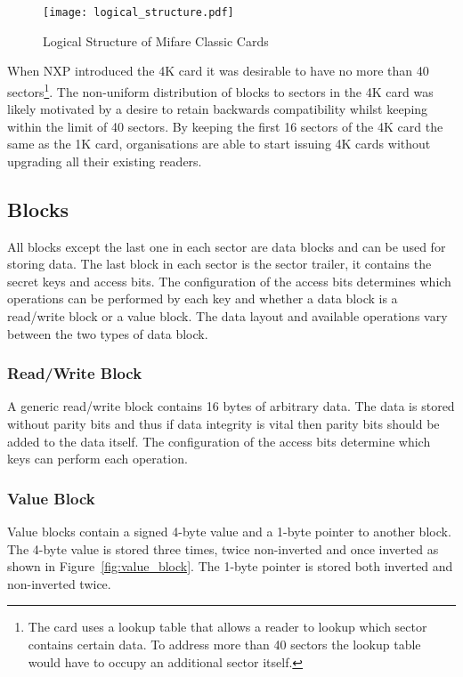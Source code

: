 \documentclass[final,dissertation.tex]{subfiles}
\begin{document}
  \begin{figure}[h]
    \centering
    \texttt{[image: logical\_structure.pdf]}
    \caption{Logical Structure of Mifare Classic Cards}\label{fig:logical_structure}
  \end{figure}

  When NXP introduced the 4K card it was desirable to have no more than 40 sectors\footnote{The card uses a lookup table that allows a reader to lookup which sector contains certain data. To address more than 40 sectors the lookup table would have to occupy an additional sector itself.}. The non-uniform distribution of blocks to sectors in the 4K card was likely motivated by a desire to retain backwards compatibility whilst keeping within the limit of 40 sectors. By keeping the first 16 sectors of the 4K card the same as the 1K card, organisations are able to start issuing 4K cards without upgrading all their existing readers.

  \subsection{Blocks}
  All blocks except the last one in each sector are data blocks and can be used for storing data. The last block in each sector is the sector trailer, it contains the secret keys and access bits. The configuration of the access bits determines which operations can be performed by each key and whether a data block is a read/write block or a value block. The data layout and available operations vary between the two types of data block.

  \subsubsection{Read/Write Block}

  A generic read/write block contains 16 bytes of arbitrary data. The data is stored without parity bits and thus if data integrity is vital then parity bits should be added to the data itself. The configuration of the access bits determine which keys can perform each operation.

  \subsubsection{Value Block}

  Value blocks contain a signed 4-byte value and a 1-byte pointer to another block. The 4-byte value is stored three times, twice non-inverted and once inverted as shown in Figure~\vref{fig:value_block}. The 1-byte pointer is stored both inverted and non-inverted twice.
\end{document}
